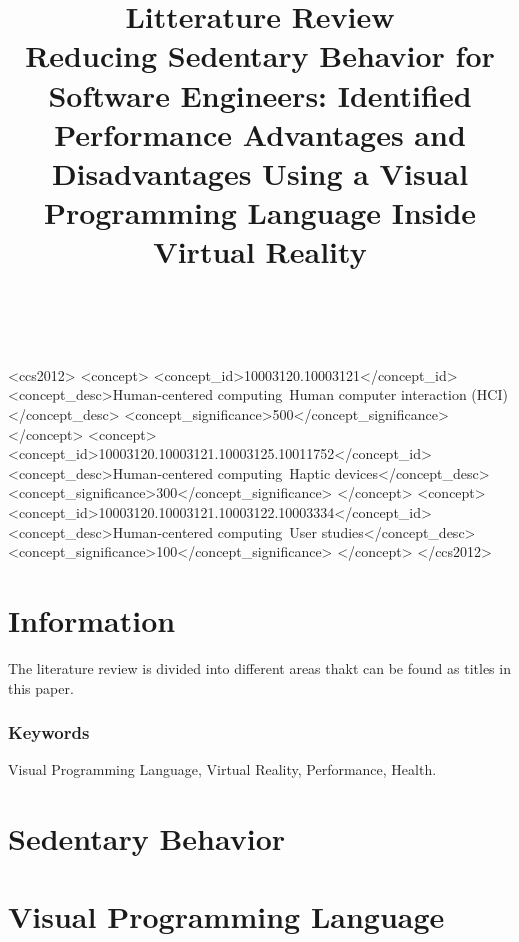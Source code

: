 \documentclass{sigchi}
\def\plaintitle{Litterature Review}
\def\subplaintitle{
  Reducing Sedentary Behavior for Software Engineers: Identified Performance Advantages and Disadvantages Using a Visual Programming Language Inside Virtual Reality}
\begin{document}
\title{%
  \plaintitle \\
  \large \subplaintitle
}

\author{
  \\
}

\maketitle



\begin{CCSXML}
  <ccs2012>
  <concept>
  <concept_id>10003120.10003121</concept_id>
  <concept_desc>Human-centered computing~Human computer interaction (HCI)</concept_desc>
  <concept_significance>500</concept_significance>
  </concept>
  <concept>
  <concept_id>10003120.10003121.10003125.10011752</concept_id>
  <concept_desc>Human-centered computing~Haptic devices</concept_desc>
  <concept_significance>300</concept_significance>
  </concept>
  <concept>
  <concept_id>10003120.10003121.10003122.10003334</concept_id>
  <concept_desc>Human-centered computing~User studies</concept_desc>
  <concept_significance>100</concept_significance>
  </concept>
  </ccs2012>
\end{CCSXML}


\section{Information}
The literature review is divided into different areas thakt can be found as titles in this paper.

\subsubsection{Keywords}
Visual Programming Language, Virtual Reality, Performance, Health.

\section{Sedentary Behavior}

\section{Visual Programming Language}
\end{document}
